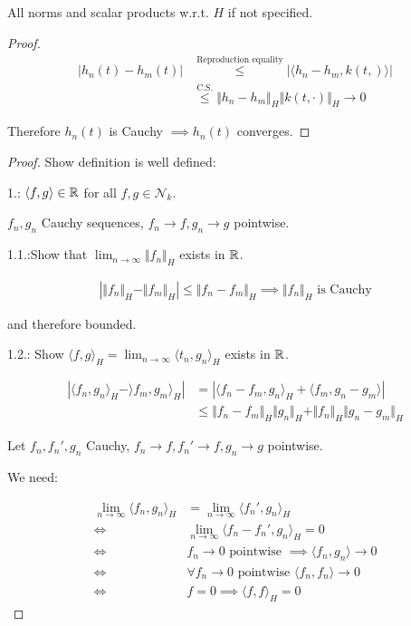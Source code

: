 All norms and scalar products w.r.t. $H$ if not specified.



\begin{proof}
    \begin{align*}
        |h_n(t)-h_m(t)|&\stackrel{\text{Reproduction equality}}{\leq}|\langle h_n-h_m,k(t,)\rangle|\\
        &\stackrel{\text{C.S.}}{\leq}\Vert h_n-h_m\Vert_H\Vert k(t,\cdot)\Vert_H\to 0   
    \end{align*}
    
    Therefore $h_n(t)$ is Cauchy $\implies h_n(t)$ converges.
\end{proof}


\begin{proof}
    Show definition is well defined:

1.: $\langle f,g\rangle\in\mathbb{R}$ for all $f,g\in\mathcal{N}_k$.

$f_n,g_n$ Cauchy sequences, $f_n\to f,g_n\to g$ pointwise.

1.1.:Show that $\lim_{n\to\infty}\Vert f_n\Vert_H$ exists in $\mathbb{R}$.

\begin{align*}
    |\Vert f_n\Vert_H -\Vert f_m\Vert_H|\leq \Vert f_n-f_m\Vert_H \implies \Vert f_n\Vert_H\text{ is Cauchy}
\end{align*}

and therefore bounded.

1.2.: Show $\langle f,g\rangle_H = \lim_{n\to\infty} \langle t_n,g_n\rangle_H$ exists in $\mathbb{R}$.

\begin{align*}
    |\langle f_n,g_n\rangle_H-\rangle f_m,g_m\rangle_H|&=|\langle f_n-f_m,g_n\rangle_H+\langle f_m,g_n-g_m\rangle|\\
    &\leq \Vert f_n-f_m\Vert_H \Vert g_n\Vert_H + \Vert f_n\Vert_H\Vert g_n-g_m\Vert_H
\end{align*}

Let $f_n,f_n',g_n$ Cauchy, $f_n\to f,f_n'\to f,g_n\to g$ pointwise.

We need: 

\begin{align*}
    \lim_{n\to\infty}\langle f_n,g_n\rangle_H&=\lim_{n\to\infty} \langle f_n',g_n\rangle_H\\
    \iff &\lim_{n\to\infty} \langle f_n-f_n',g_n\rangle_H=0\\
    \iff &f_n\to 0\text{ pointwise }\implies \langle f_n,g_n\rangle\to 0\\
    \iff &\forall f_n\to 0\text{ pointwise } \langle f_n,f_n\rangle\to 0\\
    \iff &f=0\implies \langle f,f\rangle_H=0 
\end{align*}


\end{proof}
